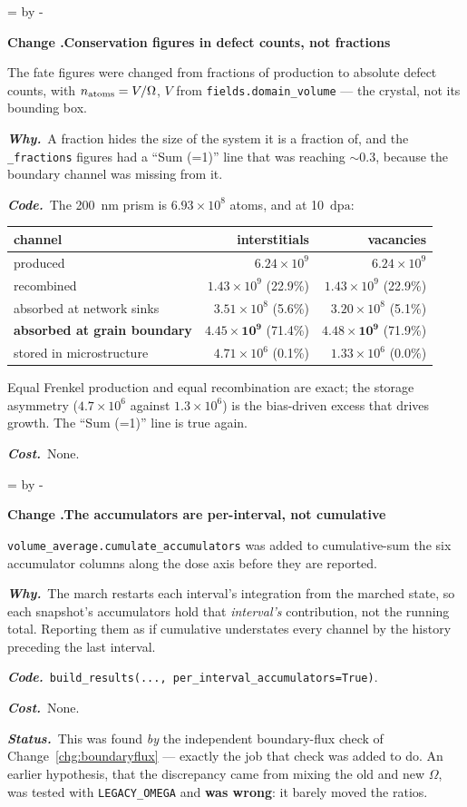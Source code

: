 \documentclass[11pt,a4paper]{article}
\newcommand{\code}[1]{\texttt{\small #1}}
\newcommand{\dpa}{\ensuremath{\mathrm{dpa}}}
\newcommand{\Om}{\ensuremath{\Omega}}
\newcommand{\needlines}[1]{%
  \par\dimen0=\pagegoal \advance\dimen0 by -\pagetotal
  \ifdim\dimen0<#1\baselineskip \newpage \fi}
\newcounter{chg}
\newcommand{\change}[1]{%
  \needlines{4}%
  \refstepcounter{chg}%
  \par\medskip\noindent
  {\bfseries\boldmath Change \thechg.\quad #1}%
  \par\nobreak\smallskip}
\newcommand{\why}[1]{\par\noindent\textbf{\itshape Why.}\ #1\par}
\newcommand{\impact}[1]{\par\noindent\textbf{\itshape Code.}\ #1\par}
\newcommand{\cost}[1]{\par\noindent\textbf{\itshape Cost.}\ #1\par}
\newcommand{\status}[1]{\par\noindent\textbf{\itshape Status.}\ #1\par}
\begin{document}
\change{Conservation figures in defect counts, not fractions}
\label{chg:counts}
The fate figures were changed from fractions of production to absolute defect
counts, with $n_{\rm atoms} = V/\Om$, $V$ from \code{fields.domain\_volume} ---
the crystal, not its bounding box.
\why{A fraction hides the size of the system it is a fraction of, and the
\code{*\_fractions} figures had a ``Sum (=1)'' line that was reaching
$\sim$0.3, because the boundary channel was missing from it.}
\impact{The 200~nm prism is $6.93\times10^{8}$ atoms, and at 10~\dpa:

\begin{center}
\begin{tabular}{lrr}
\toprule
channel & interstitials & vacancies \\
\midrule
produced & $6.24\times10^{9}$ & $6.24\times10^{9}$ \\
recombined & $1.43\times10^{9}$ (22.9\%) & $1.43\times10^{9}$ (22.9\%) \\
absorbed at network sinks & $3.51\times10^{8}$ (5.6\%) & $3.20\times10^{8}$ (5.1\%) \\
\textbf{absorbed at grain boundary} & $\mathbf{4.45\times10^{9}}$ (71.4\%) & $\mathbf{4.48\times10^{9}}$ (71.9\%) \\
stored in microstructure & $4.71\times10^{6}$ (0.1\%) & $1.33\times10^{6}$ (0.0\%) \\
\bottomrule
\end{tabular}
\end{center}

\noindent
Equal Frenkel production and equal recombination are exact; the storage
asymmetry ($4.7\times10^{6}$ against $1.3\times10^{6}$) is the bias-driven
excess that drives growth. The ``Sum (=1)'' line is true again.}
\cost{None.}

\change{The accumulators are per-interval, not cumulative}
\label{chg:peraccum}
\code{volume\_average.cumulate\_accumulators} was added to cumulative-sum the
six accumulator columns along the dose axis before they are reported.
\why{The march restarts each interval's integration from the marched state, so
each snapshot's accumulators hold that \emph{interval's} contribution, not the
running total. Reporting them as if cumulative understates every channel by the
history preceding the last interval.}
\impact{\code{build\_results(..., per\_interval\_accumulators=True)}.}
\cost{None.}
\status{This was found \emph{by} the independent boundary-flux check of
Change~\ref{chg:boundaryflux} --- exactly the job that check was added to do.
An earlier hypothesis, that the discrepancy came from mixing the old and new
\Om, was tested with \code{LEGACY\_OMEGA} and \textbf{was wrong}: it barely
moved the ratios.}
\end{document}
